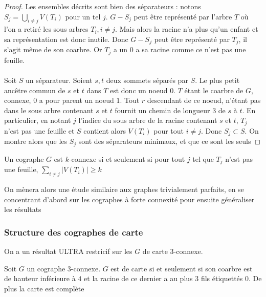 \documentclass{scrartcl}
\begin{document}
\begin{flushleft}
\begin{proof}
    Les ensembles décrits sont bien des séparateurs : notons $\displaystyle S_j = \bigcup_{i \neq j} V(T_i)$ pour un tel $j$. $G - S_j$ peut être
    représenté par l'arbre $T$ où l'on a retiré les sous arbres $T_i, i \neq j$. Mais alors la racine n'a plus qu'un enfant et sa représentation est donc
    inutile. Donc $G - S_j$ peut être représenté par $T_j$, il s'agit même de son coarbre. Or $T_j$ a un $0$ a sa racine comme ce n'est pas une feuille.
    \\~\\
    Soit $S$ un séparateur. Soient $s, t$ deux sommets séparés par $S$. Le plus petit ancêtre commun de $s$ et $t$ dans $T$
    est donc un noeud $0$. $T$ étant le coarbre de $G$, connexe, $0$ a pour parent un noeud $1$. Tout $r$ descendant de ce noeud, n'étant pas dans le
    sous arbre contenant $s$ et $t$ fournit un chemin de longueur $3$ de $s$ à $t$. En particulier, en notant $j$ l'indice du sous arbre de la racine
    contenant $s$ et $t$, $T_j$ n'est pas une feuille et $S$ contient alors $V(T_i)$ pour tout $i \neq j$. Donc $S_j \subset S$. On montre
    alors que les $S_j$ sont des séparateurs minimaux, et que ce sont les seuls
\end{proof}

\begin{cor}\label{coarbrekconn}
    Un cographe $G$ est $k$-connexe si et seulement si pour tout $j$ tel que $T_j$ n'est pas une feuille, $\sum_{i \neq j} |V(T_i)| \geq k$
\end{cor}

On mènera alors une étude similaire aux graphes trivialement parfaits, en se concentrant d'abord sur les cographes à forte connexité pour ensuite
généraliser les résultats

\subsubsection{Structure des cographes de carte}

On a un résultat ULTRA restricif sur les $G$ de carte $3$-connexe.

\begin{lem}
    Soit $G$ un cographe $3$-connexe. $G$ est de carte si et seulement si son coarbre est de hauteur inférieure à $4$ et la racine de ce dernier
    a au plus $3$ fils étiquettés $0$. De plus la carte est complète
\end{lem}


\end{flushleft}
\end{document}
